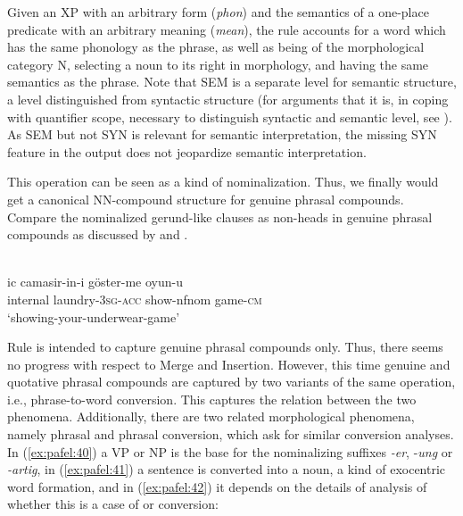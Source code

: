 \documentclass[output=paper]{LSP/langsci}
\begin{document}
Given an XP with an arbitrary  form (\textit{phon}) and the semantics of a one-place predicate with an arbitrary meaning (\textit{mean}), the rule accounts for a word which has the same phonology as the phrase, as well as being of the morphological category N, selecting a noun to its right in morphology, and having the same semantics as the phrase. Note that SEM is a separate level for semantic structure, a level distinguished from syntactic structure (for arguments that it is, in coping with quantifier scope, necessary to distinguish syntactic and semantic level, see \citealt{Pafel2005}). As SEM but not SYN is relevant for semantic interpretation, the missing SYN feature in the output does not jeopardize semantic interpretation.
 
This operation can be seen as a kind of nominalization. Thus, we finally would get a canonical NN-compound structure for genuine phrasal compounds. Compare the nominalized gerund-like clauses as non-heads in  genuine phrasal compounds as discussed by \citet{TK15} and \citet{Goksel2015}. 

\ea\label{ex:pafel:39}
      \\      
      \gll  {\ob}ic camasir-in-i göster-me{\cb} oyun-u  \\
            internal laundry-3\textsc{sg}-\textsc{acc} show-nfnom game-\textsc{cm}  \\
      \glt  `showing-your-underwear-game'
\z

Rule  is intended to capture genuine phrasal compounds only. Thus, there seems no progress with respect to Merge and Insertion. However, this time genuine and quotative phrasal compounds are captured by two variants of the same operation, i.e., phrase-to-word conversion. This captures the relation between the two phenomena. Additionally, there are two related morphological phenomena, namely phrasal  and phrasal conversion, which ask for similar conversion analyses. In (\ref{ex:pafel:40}) a VP or NP is the base for the  nominalizing suffixes \textit{{}-er}, -\textit{ung }or \textit{{}-artig}, in (\ref{ex:pafel:41}) a sentence is converted into a noun, a kind of exocentric word formation, and in (\ref{ex:pafel:42}) it depends on the details of analysis of whether this is a case of  or conversion:
\end{document}
